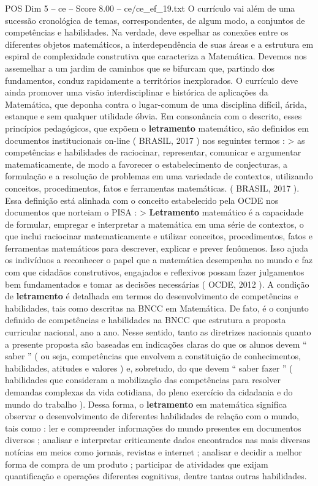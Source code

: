 \begin{textsample}{POS Dim 5 – ce – Score 8.00 – ce/ce\_ef\_19.txt}
O currículo vai além de uma sucessão cronológica de temas, correspondentes, de algum modo, a conjuntos de competências e habilidades.
Na verdade, deve espelhar as conexões entre os diferentes objetos matemáticos, a interdependência de suas áreas e a estrutura em espiral de complexidade construtiva que caracteriza a Matemática.
Devemos nos assemelhar a um jardim de caminhos que se bifurcam que, partindo dos fundamentos, conduz rapidamente a territórios inexplorados.
O currículo deve ainda promover uma visão interdisciplinar e histórica de aplicações da Matemática, que deponha contra o lugar-comum de uma disciplina difícil, árida, estanque e sem qualquer utilidade óbvia.
Em consonância com o descrito, esses princípios pedagógicos, que expõem o \textbf{letramento} matemático, são definidos em documentos institucionais on-line ( BRASIL, 2017 ) nos seguintes termos : > as competências e habilidades de raciocinar, representar, comunicar e argumentar matematicamente, de modo a favorecer o estabelecimento de conjecturas, a formulação e a resolução de problemas em uma variedade de contextos, utilizando conceitos, procedimentos, fatos e ferramentas matemáticas. ( BRASIL, 2017 ).
Essa definição está alinhada com o conceito estabelecido pela OCDE nos documentos que norteiam o PISA : > \textbf{Letramento} matemático é a capacidade de formular, empregar e interpretar a matemática em uma série de contextos, o que inclui raciocinar matematicamente e utilizar conceitos, procedimentos, fatos e ferramentas matemáticos para descrever, explicar e prever fenômenos.
Isso ajuda os indivíduos a reconhecer o papel que a matemática desempenha no mundo e faz com que cidadãos construtivos, engajados e reflexivos possam fazer julgamentos bem fundamentados e tomar as decisões necessárias ( OCDE, 2012 ).
A condição de \textbf{letramento} é detalhada em termos do desenvolvimento de competências e habilidades, tais como descritas na BNCC em Matemática.
De fato, é o conjunto definido de competências e habilidades na BNCC que estrutura a proposta curricular nacional, ano a ano.
Nesse sentido, tanto as diretrizes nacionais quanto a presente proposta são baseadas em indicações claras do que os alunos devem “ saber ” ( ou seja, competências que envolvem a constituição de conhecimentos, habilidades, atitudes e valores ) e, sobretudo, do que devem “ saber fazer ” ( habilidades que consideram a mobilização das competências para resolver demandas complexas da vida cotidiana, do pleno exercício da cidadania e do mundo do trabalho ).
Dessa forma, o \textbf{letramento} em matemática significa observar o desenvolvimento de diferentes habilidades de relação com o mundo, tais como : ler e compreender informações do mundo presentes em documentos diversos ; analisar e interpretar criticamente dados encontrados nas mais diversas notícias em meios como jornais, revistas e internet ; analisar e decidir a melhor forma de compra de um produto ; participar de atividades que exijam quantificação e operações diferentes cognitivas, dentre tantas outras habilidades.

\end{textsample}
